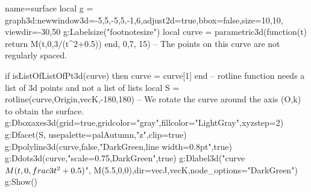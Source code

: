 \documentclass[border=5pt]{standalone}%
\begin{document}
\begin{luadraw}{name=surface}
local g = graph3d:new{window3d={-5,5,-5,5,-1,6},adjust2d=true,bbox=false,size={10,10}, viewdir={-30,50}}
g:Labelsize("footnotesize")
local curve = parametric3d(function(t) return M(t,0,3/(t^2+0.5)) end, 0,7, 15) -- The points on this curve are not regularly spaced.

if isListOfListOfPt3d(curve) then curve = curve[1] end
-- rotline function needs a list of 3d points and not a list of lists
local S = rotline(curve,{Origin,vecK},-180,180) -- We rotate the curve around the axis (O,k) to obtain the surface.
g:Dboxaxes3d({grid=true,gridcolor="gray",fillcolor="LightGray",xyzstep=2})
g:Dfacet(S, {usepalette={palAutumn,"z"},clip=true})
g:Dpolyline3d(curve,false,"DarkGreen,line width=0.8pt",true)
g:Ddots3d(curve,"scale=0.75,DarkGreen",true)
g:Dlabel3d("curve $M(t,0,\\frac3{t^2+0.5})$", M(5.5,0,0),{dir={vecJ,vecK},node_options="DarkGreen"})
g:Show()
\end{luadraw}
\end{document}

